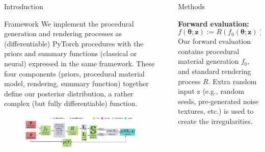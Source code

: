 \documentclass[final]{beamer}
\newlength{\sepwid}
\newlength{\twocolwid}
\newcommand{\bz}{\bm{z}}
\newcommand{\btheta}{\bm{\theta}}
\begin{document}
\begin{frame}[t]
\begin{columns}[t]
\begin{column}{\twocolwid}
\begin{block}{Introduction}
        \end{block}
        
        \vspace{2cm}
        
        \begin{block}{Framework}
            \large{
                We implement the procedural generation and rendering processes as (differentiable) PyTorch procedures with the priors and summary functions (classical or neural) expressed in the same framework. These four components (priors, procedural material model, rendering, summary function) together define our posterior distribution, a rather complex (but fully differentiable) function.
            }
            \begin{figure}[t]
            	\includegraphics[width=\textwidth]{other/framework.pdf}
            \end{figure}
        \end{block}
    \end{column} %
    
    \begin{column}{\sepwid}\end{column} %
    \begin{column}{\twocolwid} %
        \begin{block}{Methods}
        \large{
            \textbf{Forward evaluation:}
            \begin{equation*}
                f(\btheta; \bz) := R(f_0(\btheta; \bz))
            \end{equation*}
            Our forward evaluation contains procedural material generation $f_0$, and standard rendering process $R$. Extra random input z (e.g., random seeds, pre-generated noise textures, etc.) is used to create the irregularities.
        
            \vspace{0.5cm}
            
}
\end{block}
\end{column}
\end{columns}
\end{frame}
\end{document}
